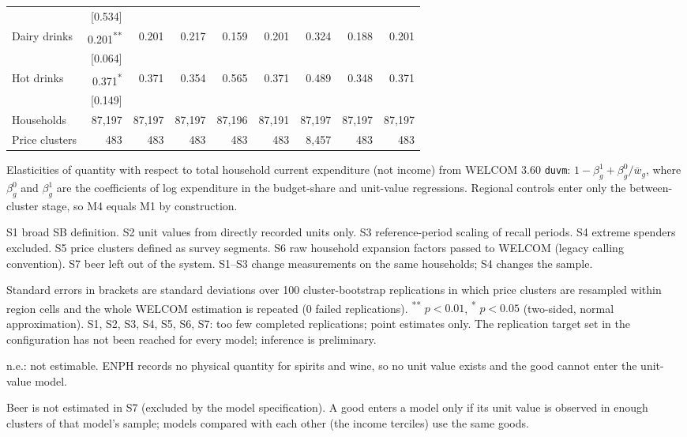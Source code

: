 \begin{table}[!htbp]
\begin{threeparttable}
\begin{tabular}{lrrrrrrrr}
 & [0.534] &  &  &  &  &  &  &  \\
Dairy drinks & 0.201\textsuperscript{**} & 0.201 & 0.217 & 0.159 & 0.201 & 0.324 & 0.188 & 0.201 \\
 & [0.064] &  &  &  &  &  &  &  \\
Hot drinks & 0.371\textsuperscript{*} & 0.371 & 0.354 & 0.565 & 0.371 & 0.489 & 0.348 & 0.371 \\
 & [0.149] &  &  &  &  &  &  &  \\
\addlinespace
Households & 87,197 & 87,197 & 87,197 & 87,196 & 87,191 & 87,197 & 87,197 & 87,197 \\
Price clusters & 483 & 483 & 483 & 483 & 483 & 8,457 & 483 & 483 \\
\bottomrule
\end{tabular}
\begin{tablenotes}[flushleft]
\footnotesize
\item Elasticities of quantity with respect to total household current expenditure (not income) from WELCOM 3.60 \texttt{duvm}: $1-\beta^1_g+\beta^0_g/\bar w_g$, where $\beta^0_g$ and $\beta^1_g$ are the coefficients of log expenditure in the budget-share and unit-value regressions. Regional controls enter only the between-cluster stage, so M4 equals M1 by construction.
\item S1 broad SB definition. S2 unit values from directly recorded units only. S3 reference-period scaling of recall periods. S4 extreme spenders excluded. S5 price clusters defined as survey segments. S6 raw household expansion factors passed to WELCOM (legacy calling convention). S7 beer left out of the system. S1--S3 change measurements on the same households; S4 changes the sample.
\item Standard errors in brackets are standard deviations over 100 cluster-bootstrap replications in which price clusters are resampled within region cells and the whole WELCOM estimation is repeated (0 failed replications). \textsuperscript{**} $p<0.01$, \textsuperscript{*} $p<0.05$ (two-sided, normal approximation). S1, S2, S3, S4, S5, S6, S7: too few completed replications; point estimates only. The replication target set in the configuration has not been reached for every model; inference is preliminary.
\item n.e.: not estimable. ENPH records no physical quantity for spirits and wine, so no unit value exists and the good cannot enter the unit-value model.
\item Beer is not estimated in S7 (excluded by the model specification). A good enters a model only if its unit value is observed in enough clusters of that model's sample; models compared with each other (the income terciles) use the same goods.
\end{tablenotes}
\end{threeparttable}
\end{table}
